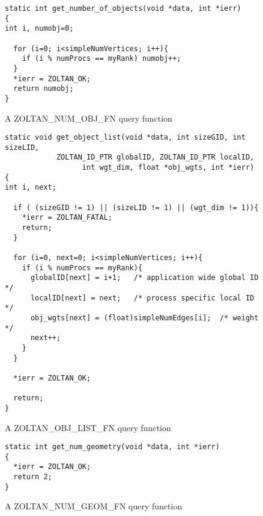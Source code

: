 \begin{figure}
\begin{flushleft}
\begin{verbatim}
static int get_number_of_objects(void *data, int *ierr)
{
int i, numobj=0;

  for (i=0; i<simpleNumVertices; i++){
    if (i % numProcs == myRank) numobj++;
  }
  *ierr = ZOLTAN_OK;
  return numobj;
}
\end{verbatim}
\end{flushleft}
\caption{A ZOLTAN\_NUM\_OBJ\_FN query function}
\label{fig:NumObj}
\end{figure}

\begin{figure}
\begin{flushleft}
\begin{verbatim}
static void get_object_list(void *data, int sizeGID, int sizeLID,
            ZOLTAN_ID_PTR globalID, ZOLTAN_ID_PTR localID,
                  int wgt_dim, float *obj_wgts, int *ierr)
{
int i, next;

  if ( (sizeGID != 1) || (sizeLID != 1) || (wgt_dim != 1)){ 
    *ierr = ZOLTAN_FATAL;
    return;
  }

  for (i=0, next=0; i<simpleNumVertices; i++){
    if (i % numProcs == myRank){
      globalID[next] = i+1;   /* application wide global ID */
      localID[next] = next;   /* process specific local ID  */
      obj_wgts[next] = (float)simpleNumEdges[i];  /* weight */
      next++;
    }
  }

  *ierr = ZOLTAN_OK;

  return;
}
\end{verbatim}
\end{flushleft}
\caption{A ZOLTAN\_OBJ\_LIST\_FN query function}
\label{fig:ObjList}
\end{figure}

\begin{figure}
\begin{flushleft}
\begin{verbatim}
static int get_num_geometry(void *data, int *ierr)
{
  *ierr = ZOLTAN_OK;
  return 2;
}
\end{verbatim}
\end{flushleft}
\caption{A ZOLTAN\_NUM\_GEOM\_FN query function}
\label{fig:NumGeom}
\end{figure}

